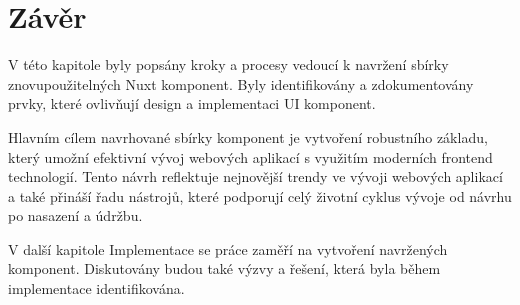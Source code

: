 \section{Závěr}
V této kapitole byly popsány kroky a procesy vedoucí k navržení sbírky znovupoužitelných Nuxt komponent. Byly identifikovány a zdokumentovány prvky, které ovlivňují design a implementaci UI komponent.

Hlavním cílem navrhované sbírky komponent je vytvoření robustního základu, který umožní efektivní vývoj webových aplikací s využitím moderních frontend technologií. Tento návrh reflektuje nejnovější trendy ve vývoji webových aplikací a také přináší řadu nástrojů, které podporují celý životní cyklus vývoje od návrhu po nasazení a údržbu.

V další kapitole Implementace se práce zaměří na vytvoření navržených komponent. Diskutovány budou také výzvy a řešení, která byla během implementace identifikována.


